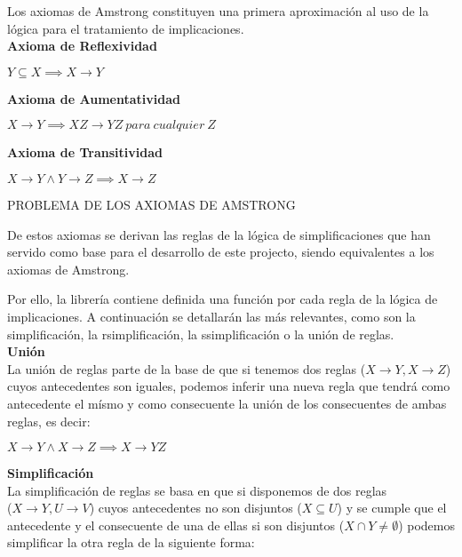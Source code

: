 Los axiomas de Amstrong constituyen una primera aproximaci\'on al uso de la l\'ogica para el tratamiento de implicaciones.\\

\textbf{Axioma de Reflexividad}

\begin{center}
    \(Y \subseteq X \implies X \to Y \)
\end{center}

\textbf{Axioma de Aumentatividad}

\begin{center}
    \(X \to Y \implies XZ \to YZ \ para \ cualquier \ Z \)
\end{center}

\textbf{Axioma de Transitividad}

\begin{center}
    \(X \to Y \wedge Y \to Z \implies X \to Z \)
\end{center}

PROBLEMA DE LOS AXIOMAS DE AMSTRONG

De estos axiomas se derivan las reglas de la l\'ogica de simplificaciones que han servido como base para el desarrollo de este projecto, siendo equivalentes a los axiomas de Amstrong.

Por ello, la librer\'ia contiene definida una funci\'on por cada regla de la l\'ogica de implicaciones. A continuaci\'on se detallar\'an las m\'as relevantes, como son la simplificaci\'on, la rsimplificaci\'on, la ssimplificaci\'on o la uni\'on de reglas.\\

\textbf{Uni\'on}\\
La uni\'on de reglas parte de la base de que si tenemos dos reglas (\(X \to Y , X \to Z\)) cuyos antecedentes son iguales, podemos inferir una nueva regla que tendr\'a como antecedente el m\'ismo y como consecuente la uni\'on de los consecuentes de ambas reglas, es decir:

\begin{center}
    \(X \to Y \wedge X \to Z \implies X \to YZ \)
\end{center}


\bigskip
\textbf{Simplificaci\'on}\\
La simplificaci\'on de reglas se basa en que si disponemos de dos reglas \\ (\(X \to Y , U \to V\)) cuyos antecedentes no son disjuntos (\(X \subseteq U\)) y se cumple que el antecedente y el consecuente de una de ellas si son disjuntos (\(X \cap Y \neq \emptyset\)) podemos simplificar la otra regla de la siguiente forma:

